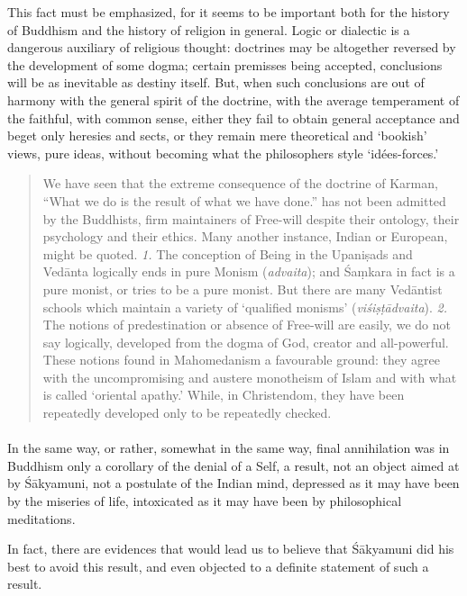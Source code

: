 \documentclass[a4paper, 11pt, oneside, english]{article}
\begin{document}
This fact must be emphasized, for it seems to be important both for the history of Buddhism and the history of religion in general. Logic or dialectic is a dangerous auxiliary of religious thought: doctrines may be altogether reversed by the development of some dogma; certain premisses being accepted, conclusions will be as inevitable as destiny itself. But, when such conclusions are out of harmony with the general spirit of the doctrine, with the average temperament of the faithful, with common sense, either they fail to obtain general acceptance and beget only heresies and sects, or they remain mere theoretical and `bookish' views, pure ideas, without becoming what the philosophers style `idées-forces.'
\begin{quotation}
\small
We have seen that the extreme consequence of the doctrine of Karman, ``What we do is the result of what we have done.'' has not been admitted by the Buddhists, firm maintainers of Free-will despite their ontology, their psychology and their ethics. Many another instance, Indian or European, might be quoted. \emph{1.} The conception of Being in the Upaniṣads and Vedānta logically ends in pure Monism (\emph{advaita}); and Śaṃkara in fact is a pure monist, or tries to be a pure monist. But there are many Vedāntist schools which maintain a variety of `qualified monisms' (\emph{viśiṣṭādvaita}). \emph{2.} The notions of predestination or absence of Free-will are easily, we do not say logically, developed from the dogma of God, creator and all-powerful. These notions found in Mahomedanism a favourable ground: they agree with the uncompromising and austere monotheism of Islam and with what is called `oriental apathy.' While, in Christendom, they have been repeatedly developed only to be repeatedly checked.
\end{quotation}
\paragraph{}
In the same way, or rather, somewhat in the same way, final annihilation was in Buddhism only a corollary of the denial of a Self, a result, not an object aimed at by Śākyamuni, not a postulate of the Indian mind, depressed as it may have been by the miseries of life, intoxicated as it may have been by philosophical meditations.

In fact, there are evidences that would lead us to believe that Śākyamuni did his best to avoid this result, and even objected to a definite statement of such a result.
\end{document}
